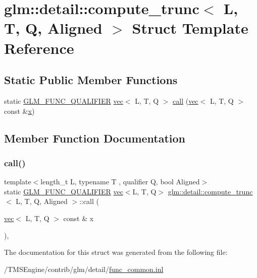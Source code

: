 \hypertarget{structglm_1_1detail_1_1compute__trunc}{}\section{glm\+:\+:detail\+:\+:compute\+\_\+trunc$<$ L, T, Q, Aligned $>$ Struct Template Reference}
\label{structglm_1_1detail_1_1compute__trunc}
\subsection*{Static Public Member Functions}
\begin{DoxyCompactItemize}
\item 
static \hyperlink{setup_8hpp_a33fdea6f91c5f834105f7415e2a64407}{G\+L\+M\+\_\+\+F\+U\+N\+C\+\_\+\+Q\+U\+A\+L\+I\+F\+I\+ER} \hyperlink{structglm_1_1vec}{vec}$<$ L, T, Q $>$ \hyperlink{structglm_1_1detail_1_1compute__trunc_a6e3185641ef24c593f34dc6c11f46ca6}{call} (\hyperlink{structglm_1_1vec}{vec}$<$ L, T, Q $>$ const \&\hyperlink{_s_d_l__opengl_8h_ad0e63d0edcdbd3d79554076bf309fd47}{x})
\end{DoxyCompactItemize}


\subsection{Member Function Documentation}
\mbox{\label{structglm_1_1detail_1_1compute__trunc_a6e3185641ef24c593f34dc6c11f46ca6}} 
\subsubsection{\texorpdfstring{call()}{call()}}
{\footnotesize\ttfamily template$<$length\+\_\+t L, typename T , qualifier Q, bool Aligned$>$ \\
static \hyperlink{setup_8hpp_a33fdea6f91c5f834105f7415e2a64407}{G\+L\+M\+\_\+\+F\+U\+N\+C\+\_\+\+Q\+U\+A\+L\+I\+F\+I\+ER} \hyperlink{structglm_1_1vec}{vec}$<$L, T, Q$>$ \hyperlink{structglm_1_1detail_1_1compute__trunc}{glm\+::detail\+::compute\+\_\+trunc}$<$ L, T, Q, Aligned $>$\+::call (\begin{DoxyParamCaption}\item[{\hyperlink{structglm_1_1vec}{vec}$<$ L, T, Q $>$ const \&}]{x }\end{DoxyParamCaption})\hspace{0.3cm}{\ttfamily [inline]}, {\ttfamily [static]}}



The documentation for this struct was generated from the following file\+:\begin{DoxyCompactItemize}
\item 
/\+T\+M\+S\+Engine/contrib/glm/detail/\hyperlink{func__common_8inl}{func\+\_\+common.\+inl}\end{DoxyCompactItemize}
